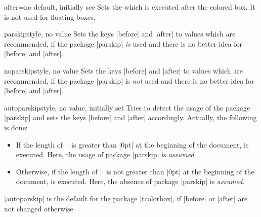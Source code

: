 \begin{docTcbKey}{after}{=}{no default, initially see }
  Sets the  which is executed after the colored box.
  It is not used for floating boxes.
\end{docTcbKey}

\begin{docTcbKey}{parskip}{}{style, no value}
  Sets the keys |before| and |after| to values which are
  recommended, if the package |parskip| \emph{is} used and there is no better
  idea for |before| and |after|.
\begin{dispListing}
\end{dispListing}
\end{docTcbKey}

\begin{docTcbKey}{noparskip}{}{style, no value}
  Sets the keys |before| and |after| to values which are
  recommended, if the package |parskip| is \emph{not} used and there is no better
  idea for |before| and |after|.
\begin{dispListing}
\end{dispListing}
\end{docTcbKey}

\begin{docTcbKey}{autoparskip}{}{style, no value, initially set}
  Tries to detect the usage of the package |parskip| and sets
  the keys |before| and |after| accordingly. Actually, the following is done:
  \begin{itemize}
  \item If the length of |\parskip| is greater than |0pt| at the beginning of the document,
     is executed. Here, the usage of package |parskip| is \emph{assumed}.
  \item Otherwise, if the length of |\parskip| is not greater than |0pt| at the beginning of the document,
     is executed. Here, the absence of package |parskip| is \emph{assumed}.
  \end{itemize}
  |autoparskip| is the default for the package |tcolorbox|, if |before| or |after|
  are not changed otherwise.
\end{docTcbKey}

